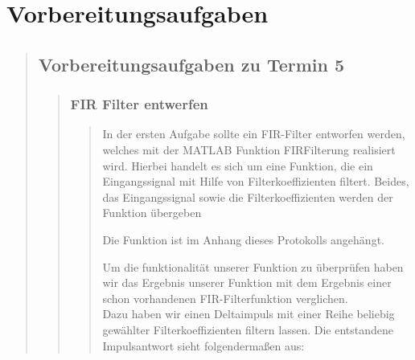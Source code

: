 \section{Vorbereitungsaufgaben}
\begin{quote}
    
    \subsection{Vorbereitungsaufgaben zu Termin 5}
    \begin{quote}
    	
    	\subsubsection{FIR Filter entwerfen}
    	\begin{quote}
		    
			In der ersten Aufgabe sollte ein FIR-Filter entworfen werden, welches mit der MATLAB
			Funktion FIRFilterung realisiert wird. Hierbei handelt es sich um eine Funktion, die ein Eingangssignal mit Hilfe
			von Filterkoeffizienten filtert. Beides, das Eingangssignal sowie die Filterkoeffizienten werden der Funktion
			übergeben\vspace{1em}
			
			Die Funktion ist im Anhang dieses Protokolls angehängt.\vspace{1em}
			
			Um die funktionalität unserer Funktion zu überprüfen haben wir das Ergebnis unserer Funktion mit dem Ergebnis einer
			schon vorhandenen FIR-Filterfunktion verglichen.\\
			Dazu haben wir einen Deltaimpuls mit einer Reihe beliebig gewählter Filterkoeffizienten filtern lassen. Die entstandene Impulsantwort
			sieht folgendermaßen aus:
			

\end{quote}
\end{quote}
\end{quote}
